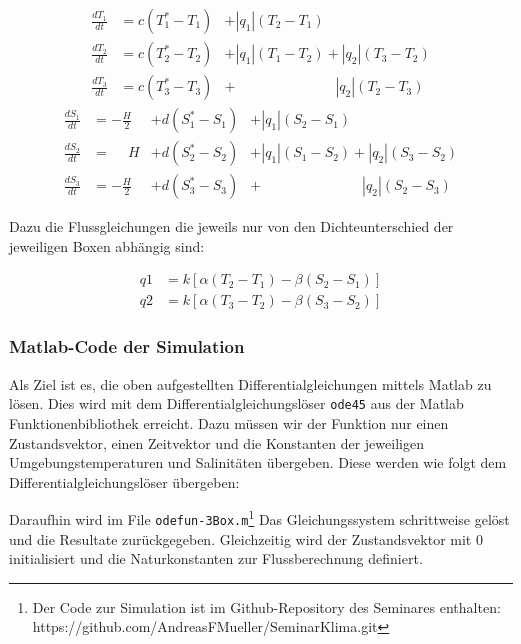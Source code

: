\begin{equation}
\begin{aligned}
\frac{dT_1}{dt} &= c(T_1^*-T_1)&+|q_1|(T_2-T_1)\phantom{+|q_2|(T_3-T_2)}
\\
\frac{dT_2}{dt} &= c(T_2^*-T_2)&+|q_1|(T_1-T_2)+|q_2|(T_3-T_2)
\\
\frac{dT_3}{dt} &= c(T_3^*-T_3)&+ \phantom{+|q_1|(T_1-T_2)}|q_2|(T_2-T_3)
\end{aligned}
\end{equation}
\begin{equation}
\begin{aligned}
\frac{dS_1}{dt} &= -\frac{H}{2} &+ d(S_1^*-S_1)&+|q_1|(S_2-S_1)\phantom{+|q_2|(S_3-S_2)}
\\
\frac{dS_2}{dt} &= \phantom{-}H &+ d(S_2^*-S_2)&+|q_1|(S_1-S_2)+|q_2|(S_3-S_2)	
\\
\frac{dS_3}{dt} &= -\frac{H}{2} &+d(S_3^*-S_3)&+ \phantom{+|q_1|(S_1-S_2)}|q_2|(S_2-S_3)
\end{aligned}
\end{equation}	

Dazu die Flussgleichungen die jeweils nur von den Dichteunterschied der jeweiligen Boxen abhängig sind:

\begin{equation}
\begin{aligned}
 q1 &= k[\alpha(T_2-T_1)-\beta(S_2-S_1)] 
 \\
 q2 &= k[\alpha(T_3-T_2)-\beta(S_3-S_2)]
\end{aligned}
\end{equation}

\subsubsection{Matlab-Code der Simulation}

Als Ziel ist es, die oben aufgestellten Differentialgleichungen mittels Matlab zu lösen. Dies wird mit dem Differentialgleichungslöser \texttt{ode45} aus der Matlab Funktionenbibliothek erreicht.
Dazu müssen wir der Funktion nur einen Zustandsvektor, einen Zeitvektor und die Konstanten der jeweiligen Umgebungstemperaturen und Salinitäten übergeben.
\label{thermohalin:listing:input}
Diese werden wie folgt dem Differentialgleichungslöser übergeben:
\label{thermohalin:listing:uebergabe}

Daraufhin wird im File \texttt{odefun-3Box.m}\footnote{Der Code zur Simulation ist im Github-Repository des Seminares enthalten: https://github.com/AndreasFMueller/SeminarKlima.git} Das Gleichungssystem schrittweise gelöst und die Resultate zurückgegeben. Gleichzeitig wird der Zustandsvektor mit $0$ initialisiert und die Naturkonstanten zur Flussberechnung definiert.

